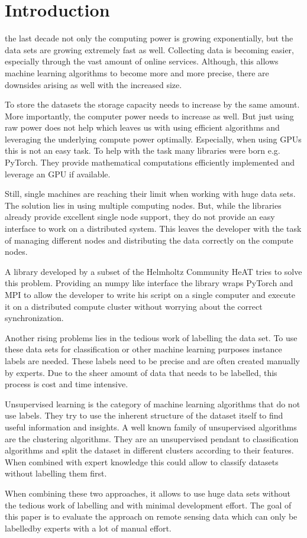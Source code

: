 
\section{Introduction}
\label{sec:intro}
 the last decade not only the computing power is growing exponentially, but the data sets are growing extremely fast as well.
Collecting data is becoming easier, especially through the vast amount of online services.
Although, this allows machine learning algorithms to become more and more precise, there are downsides arising as well with
the increased size.

To store the datasets the storage capacity needs to increase by the same amount. More importantly, the computer power needs to increase
as well. But just using raw power does not help which leaves us with using efficient algorithms and leveraging the underlying compute power optimally.
Especially, when using \glspl{GPU} this is not an easy task. To help with the task many libraries were born e.g. PyTorch.
They provide mathematical computations efficiently implemented and leverage an \gls{GPU} if available.

Still, single machines are reaching their limit when working with huge data sets. The solution lies in using multiple computing nodes.
But, while the libraries already provide excellent single node support, they do not provide an easy interface to work on a distributed system.
This leaves the developer with the task of managing different nodes and distributing the data correctly on the compute nodes.

A library developed by a subset of the Helmholtz Community \gls{HeAT} tries to solve this problem.
Providing an \gls{numpy} like interface the library wraps \gls{PyTorch} and \gls{MPI} to allow the developer to write his script on a single computer
and execute it on a distributed compute cluster without worrying about the correct synchronization.

Another rising problems lies in the tedious work of labelling the data set.
To use these data sets for classification or other machine learning purposes instance labels are needed.
These labels need to be precise and are often created manually by experts.
Due to the sheer amount of data that needs to be labelled, this process is cost and time intensive.

Unsupervised learning is the category of machine learning algorithms that do not use labels. They try to
use the inherent structure of the dataset itself to find useful information and insights.
A well known family of unsupervised algorithms are the clustering algorithms. They are an unsupervised pendant to classification algorithms
and split the dataset in different clusters according to their features.
When combined with expert knowledge this could allow to classify datasets without labelling them first.

When combining these two approaches, it allows to use huge data sets without the tedious work of labelling and with minimal development effort.
The goal of this paper is to evaluate the approach on remote sensing data which can only be labelledby experts with a lot of manual effort.
